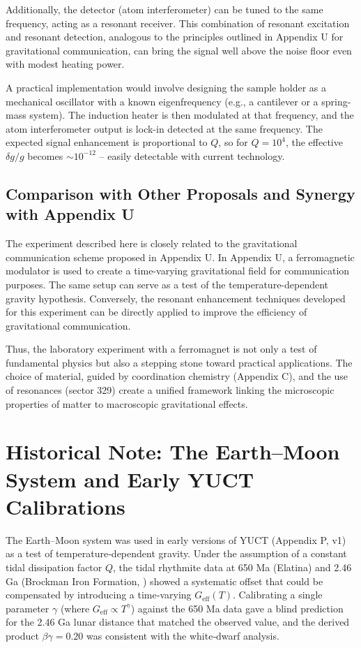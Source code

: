 \documentclass[12pt]{article}
\theoremstyle{remark}
\begin{document}
	Additionally, the detector (atom interferometer) can be tuned to the same frequency, acting as a resonant receiver. This combination of resonant excitation and resonant detection, analogous to the principles outlined in Appendix U for gravitational communication, can bring the signal well above the noise floor even with modest heating power.
	
	A practical implementation would involve designing the sample holder as a mechanical oscillator with a known eigenfrequency (e.g., a cantilever or a spring-mass system). The induction heater is then modulated at that frequency, and the atom interferometer output is lock-in detected at the same frequency. The expected signal enhancement is proportional to \(Q\), so for \(Q = 10^4\), the effective \(\delta g/g\) becomes \(\sim 10^{-12}\) – easily detectable with current technology.
	
	\subsection{Comparison with Other Proposals and Synergy with Appendix U}
	\label{subsec:comparison-appU}
	
	The experiment described here is closely related to the gravitational communication scheme proposed in Appendix U. In Appendix U, a ferromagnetic modulator is used to create a time-varying gravitational field for communication purposes. The same setup can serve as a test of the temperature-dependent gravity hypothesis. Conversely, the resonant enhancement techniques developed for this experiment can be directly applied to improve the efficiency of gravitational communication.
	
	Thus, the laboratory experiment with a ferromagnet is not only a test of fundamental physics but also a stepping stone toward practical applications. The choice of material, guided by coordination chemistry (Appendix C), and the use of resonances (sector 329) create a unified framework linking the microscopic properties of matter to macroscopic gravitational effects.
	
	\section{Historical Note: The Earth–Moon System and Early YUCT Calibrations}
	\label{sec:earth-moon}
	
	The Earth–Moon system was used in early versions of YUCT (Appendix P, v1) as a test of temperature‑dependent gravity. Under the assumption of a constant tidal dissipation factor \(Q\), the tidal rhythmite data at 650 Ma (Elatina) and 2.46 Ga (Brockman Iron Formation, \cite{Lantink2022}) showed a systematic offset that could be compensated by introducing a time‑varying \(G_{\mathrm{eff}}(T)\). Calibrating a single parameter \(\gamma\) (where \(G_{\mathrm{eff}}\propto T^{\gamma}\)) against the 650 Ma data gave a blind prediction for the 2.46 Ga lunar distance that matched the observed value, and the derived product \(\beta\gamma = 0.20\) was consistent with the white‑dwarf analysis.
	
\end{document}

